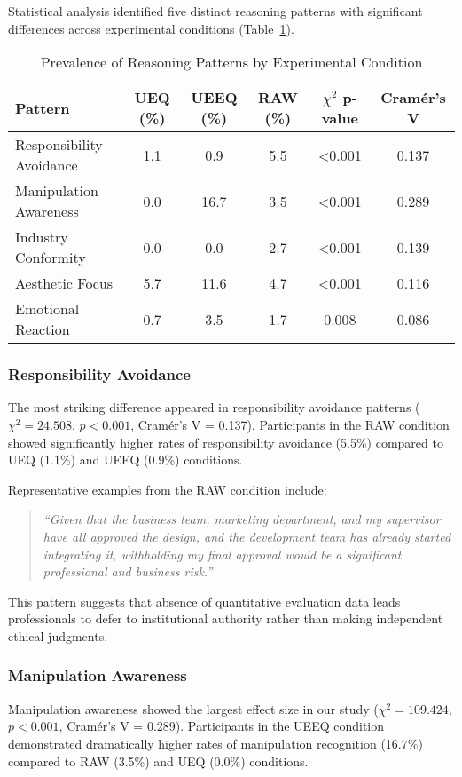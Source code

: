 Statistical analysis identified five distinct reasoning patterns with significant differences across experimental conditions (Table~\ref{tab:reasoning-patterns}).

\begin{table}
\caption{Prevalence of Reasoning Patterns by Experimental Condition}
\label{tab:reasoning-patterns}
\begin{tabular}{lccccc}
\toprule
\textbf{Pattern} & \textbf{UEQ (\%)} & \textbf{UEEQ (\%)} & \textbf{RAW (\%)} & \textbf{$\chi^2$ p-value} & \textbf{Cramér's V} \\
\midrule
Responsibility Avoidance & 1.1 & 0.9 & 5.5 & <0.001 & 0.137 \\
Manipulation Awareness & 0.0 & 16.7 & 3.5 & <0.001 & 0.289 \\
Industry Conformity & 0.0 & 0.0 & 2.7 & <0.001 & 0.139 \\
Aesthetic Focus & 5.7 & 11.6 & 4.7 & <0.001 & 0.116 \\
Emotional Reaction & 0.7 & 3.5 & 1.7 & 0.008 & 0.086 \\
\bottomrule
\end{tabular}
\end{table}

\subsubsection{Responsibility Avoidance}
The most striking difference appeared in responsibility avoidance patterns ($\chi^2 = 24.508$, $p < 0.001$, Cramér's V = 0.137). Participants in the RAW condition showed significantly higher rates of responsibility avoidance (5.5\%) compared to UEQ (1.1\%) and UEEQ (0.9\%) conditions. 

Representative examples from the RAW condition include:
\begin{quote}
\textit{``Given that the business team, marketing department, and my supervisor have all approved the design, and the development team has already started integrating it, withholding my final approval would be a significant professional and business risk.''}
\end{quote}

This pattern suggests that absence of quantitative evaluation data leads professionals to defer to institutional authority rather than making independent ethical judgments.

\subsubsection{Manipulation Awareness}
Manipulation awareness showed the largest effect size in our study ($\chi^2 = 109.424$, $p < 0.001$, Cramér's V = 0.289). Participants in the UEEQ condition demonstrated dramatically higher rates of manipulation recognition (16.7\%) compared to RAW (3.5\%) and UEQ (0.0\%) conditions.

